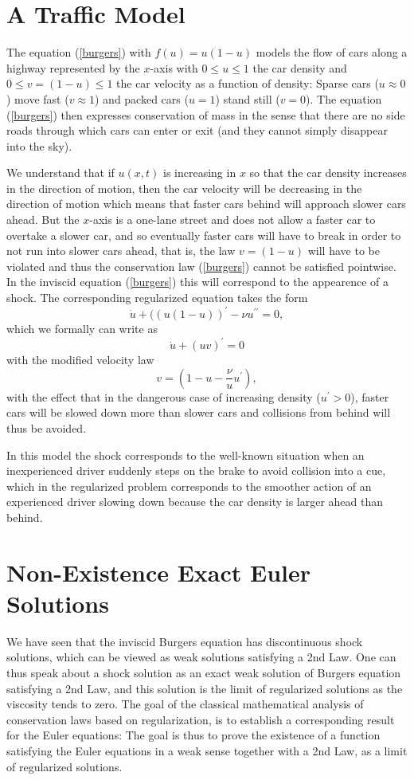 \section{A Traffic Model}

The equation (\ref{burgers}) with $f(u)=u(1-u)$ models the flow 
of cars along a highway represented by the $x$-axis with
$0\le u\le 1$ the car density and $0\le v=(1-u)\le 1$ the 
car velocity as a function of density: Sparse cars ($u\approx 0$)
move fast ($v\approx 1$) and packed cars ($u=1$) stand still
($v=0$). The equation (\ref{burgers}) then expresses
conservation of mass in the sense that there are no side roads
through which cars can enter or exit (and they cannot simply disappear
into the sky). 

We understand that if $u(x,t)$ is increasing
in $x$ so that the car density increases in the direction of motion,
then the car velocity will be decreasing in the direction of motion
which means that 
faster cars behind will approach slower cars ahead.
 But the $x$-axis
is a one-lane street and does not allow a faster car to overtake a slower
car, and so 
eventually faster cars will have to break in order to not run 
into slower cars ahead, that is, the law $v=(1-u)$ will have to
be violated and thus the conservation law (\ref{burgers})
cannot be satisfied pointwise. In the inviscid equation (\ref{burgers})
this will correspond to the appearence of a shock. The corresponding
regularized equation takes the form
\[
\dot u +((u(1-u))^\prime -\nu u^{\prime\prime} =0,
\]
which we formally can write as
\[
\dot u +(uv)^\prime =0
\]
with the modified velocity law
\[
v=(1-u-\frac{\nu}{u} u^\prime ),
\]
with the effect that in the dangerous case of 
increasing density ($u^\prime >0$),
faster cars will be slowed down more than slower cars and
collisions from behind will thus be avoided.

In this model the shock corresponds to the well-known situation 
when an inexperienced driver suddenly steps on the brake to avoid
collision into a cue, which in the regularized problem 
corresponds to the smoother action of an experienced driver
slowing down because the car density is larger
ahead than behind.





\section{Non-Existence Exact Euler Solutions}

We have seen that the inviscid Burgers equation has discontinuous
shock solutions, which can be viewed as weak solutions satisfying
a 2nd Law. One can thus speak about a shock solution as an exact 
weak solution of Burgers equation satisfying a 2nd Law, and 
this solution is the limit of regularized solutions as the 
viscosity tends to zero.
The goal of the classical mathematical analysis of conservation laws
based on regularization, is to establish a corresponding result for
the Euler equations: The goal is thus to prove the existence of a function
satisfying the Euler equations in a weak sense together with a 2nd Law,
as a limit of regularized solutions.

